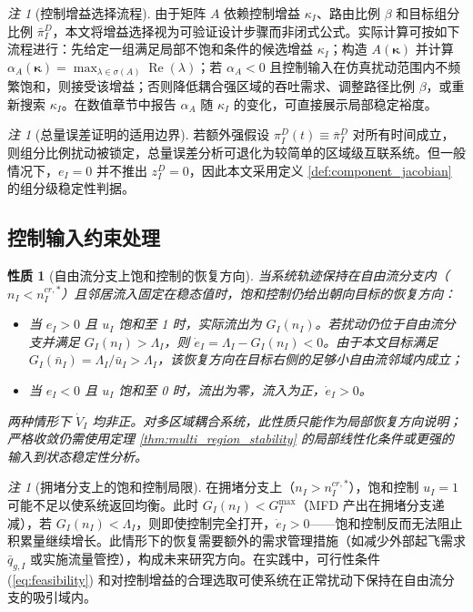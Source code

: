 \documentclass[a4paper,12pt]{article}
\theoremstyle{plain}
\newtheorem{property}[theorem]{性质}
\theoremstyle{definition}
\theoremstyle{remark}
\newtheorem{remark}[theorem]{注}
\begin{document}
\begin{remark}[控制增益选择流程]\label{rem:gain_selection}
由于矩阵 $A$ 依赖控制增益 $\kappa_I$、路由比例 $\beta$ 和目标组分比例 $\bar\pi_I^D$，本文将增益选择视为可验证设计步骤而非闭式公式。实际计算可按如下流程进行：先给定一组满足局部不饱和条件的候选增益 $\kappa_I$；构造 $A(\bm\kappa)$ 并计算 $\alpha_A(\bm\kappa)=\max_{\lambda\in\sigma(A)}\operatorname{Re}(\lambda)$；若 $\alpha_A<0$ 且控制输入在仿真扰动范围内不频繁饱和，则接受该增益；否则降低耦合强区域的吞吐需求、调整路径比例 $\beta$，或重新搜索 $\kappa_I$。在数值章节中报告 $\alpha_A$ 随 $\kappa_I$ 的变化，可直接展示局部稳定裕度。
\end{remark}

\begin{remark}[总量误差证明的适用边界]\label{rem:total_error_limitation}
若额外强假设 $\pi_I^D(t)\equiv\bar\pi_I^D$ 对所有时间成立，则组分比例扰动被锁定，总量误差分析可退化为较简单的区域级互联系统。但一般情况下，$e_I=0$ 并不推出 $z_I^D=0$，因此本文采用定义 \ref{def:component_jacobian} 的组分级稳定性判据。
\end{remark}

\subsection{控制输入约束处理}

\begin{property}[自由流分支上饱和控制的恢复方向]\label{prop:saturation_stability}
当系统轨迹保持在自由流分支内（$n_I < n_I^{cr,*}$）且邻居流入固定在稳态值时，饱和控制仍给出朝向目标的恢复方向：
\begin{itemize}
    \item 当 $e_I > 0$ 且 $u_I$ 饱和至 1 时，实际流出为 $G_I(n_I)$。若扰动仍位于自由流分支并满足 $G_I(n_I)>\Lambda_I$，则 $\dot e_I=\Lambda_I-G_I(n_I)<0$。由于本文目标满足 $G_I(\bar n_I)=\Lambda_I/\bar u_I>\Lambda_I$，该恢复方向在目标右侧的足够小自由流邻域内成立；
    \item 当 $e_I < 0$ 且 $u_I$ 饱和至 0 时，流出为零，流入为正，$\dot{e}_I > 0$。
\end{itemize}
两种情形下 $\dot{V}_I$ 均非正。对多区域耦合系统，此性质只能作为局部恢复方向说明；严格收敛仍需使用定理 \ref{thm:multi_region_stability} 的局部线性化条件或更强的输入到状态稳定性分析。
\end{property}

\begin{remark}[拥堵分支上的饱和控制局限]\label{rem:congested_saturation}
在拥堵分支上（$n_I > n_I^{cr,*}$），饱和控制 $u_I = 1$ 可能不足以使系统返回均衡。此时 $G_I(n_I) < G_I^{\max}$（MFD 产出在拥堵分支递减），若 $G_I(n_I) < \Lambda_I$，则即使控制完全打开，$\dot{e}_I > 0$——饱和控制反而无法阻止积累量继续增长。此情形下的恢复需要额外的需求管理措施（如减少外部起飞需求 $\bar{q}_{g,I}$ 或实施流量管控），构成未来研究方向。在实践中，可行性条件 (\ref{eq:feasibility}) 和对控制增益的合理选取可使系统在正常扰动下保持在自由流分支的吸引域内。
\end{remark}
\end{document}
